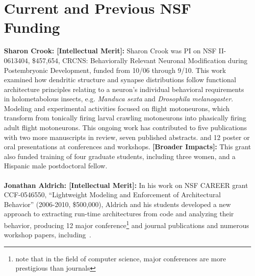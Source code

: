 \documentclass[11pt,letterpaper]{article}
\newcommand{\bfhead}[1]{\noindent \textbf{#1:}}
\begin{document}
\section{Current and Previous NSF Funding}
\bfhead{Sharon Crook: [Intellectual Merit]} Sharon Crook was PI on NSF II-0613404, \$457,654, CRCNS: Behaviorally Relevant Neuronal Modification during Postembryonic Development, funded from 10/06 through 9/10. 
This work examined how dendritic structure and synapse distributions follow functional architecture principles relating to a neuron's individual behavioral requirements in holometabolous insects, e.g. \textit{Manduca sexta} and \textit{Drosophila melanogaster.} 
Modeling and experimental activities focused on flight motoneurons, which transform from tonically firing larval crawling motoneurons into phasically firing adult flight motoneurons. 
This ongoing work has contributed to five publications\cite{hohensee, meseke, herrera-valdez_2012, ryglewski_2012, herrera-valdez_jcns_2013} with two more manuscripts in review, seven published abstracts\cite{jennings_2007, herrera-valdez_2009, berger_2009, herrera-valdez_2010, smith_2011, berger_2012, berger_2013}. and 12 poster or oral presentations at conferences and workshops. 
\bfhead{[Broader Impacts]} This grant also funded training of four graduate students, including three women, and a Hispanic male postdoctoral fellow. 
\\\\
\bfhead{Jonathan Aldrich: [Intellectual Merit]} In his work on NSF CAREER grant
CCF-0546550, ``Lightweight Modeling and Enforcement of
Architectural Behavior'' (2006-2010, \$500,000), Aldrich and his
students developed a new approach to extracting
run-time architectures from code and analyzing their
behavior, producing 12 major conference\footnote{note that in the field of computer science, major conferences are more prestigious than journals} and journal publications and numerous workshop papers,
including~\cite{AAC07,bierhoff07:modular_typestate_checking,AAN+08,AA07a,AA07b,AA08d,AA09a,AA09b,AB10}.
\end{document}
